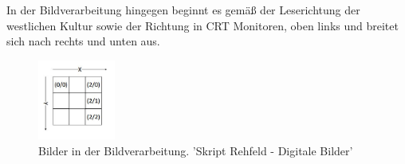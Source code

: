 \documentclass[tog]{acmsiggraph}
\begin{document}
In der Bildverarbeitung hingegen beginnt es gemäß der Leserichtung der westlichen Kultur sowie der Richtung in CRT Monitoren, oben links und breitet sich nach rechts und unten aus.

\begin{figure}[ht]
  \centering
  \includegraphics[width=1.0in]{images/koordinatenSystemBildverarbeitung}
  \caption{Bilder in der Bildverarbeitung. 'Skript Rehfeld - Digitale Bilder'}
  \label{fig:Koordinatenursprung oben links}
\end{figure}


\nocite{*}

\end{document}
